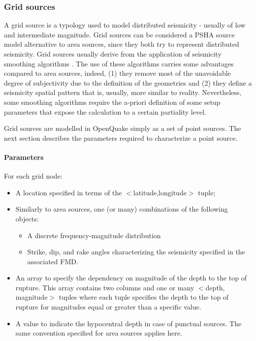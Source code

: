 \subsubsection{Grid sources}
\label{hazard:seismic_source_types:gridSources}
A grid source  is a typology used to model distributed seismicity - usually 
of low and intermediate magnitude.
%
Grid sources can be considered a PSHA source model alternative to area 
sources, since they both try to represent distributed seismicity. Grid sources 
usually derive from the application of seismicity smoothing algorithms 
\citep{frankel1995,woo1996}. 
%
The use of these algorithms carries some advantages compared to area sources, 
indeed, (1) they remove most of the unavoidable degree of subjectivity due to 
the definition of the geometries and (2) they define a seismicity spatial 
pattern that is, usually, more similar to reality. Nevertheless, some smoothing 
algorithms require the a-priori definition of some setup parameters that expose 
the calculation to a certain partiality level.

Grid sources are modelled in OpenQuake simply as a set of 
point sources. The next section describes the parameters required to 
characterize a point source.
%
\paragraph{Parameters}
%
For each grid node:
\begin{itemize}
\item A location specified in terms of the $<$latitude,longitude$>$ tuple;
\item Similarly to area sources, one (or many) combinations of the following 
objects:
	\begin{itemize}
	\item A discrete frequency-magnitude distribution
	\item Strike, dip, and rake angles characterizing the seismicity 
	specified in the associated FMD. 
	\end{itemize}
\item An array to specify the dependency on magnitude of the depth to 
	the top of rupture. This array contains two columns and one or many 
	$<$depth, magnitude$>$ tuples where each tuple specifies the depth to the 
	top of rupture for magnitudes equal or greater than a specific value. 
\item A value to indicate the hypocentral depth in case of punctual sources. 
	The same convention specified for area sources applies here. 
\end{itemize} 
%
